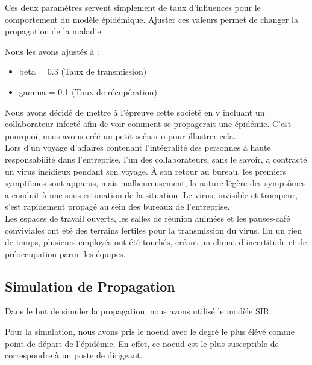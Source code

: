 \documentclass{article}
\begin{document}
Ces deux paramètres servent simplement de taux d'influences pour le comportement du modèle épidémique. Ajuster ces valeurs permet de changer la propagation de la maladie.

Nous les avons ajustés à :
\begin{itemize}
    \item beta = 0.3 (Taux de transmission)
    \item gamma = 0.1 (Taux de récupération)
\end{itemize}


Nous avons décidé de mettre à l'épreuve cette société en y incluant un collaborateur infecté afin de voir comment se propagerait une épidémie. C'est pourquoi, nous avons créé un petit scénario pour illustrer cela. \\

Lors d'un voyage d'affaires contenant l'intégralité des personnes à haute responsabilité dans l'entreprise, l'un des collaborateurs, sans le savoir, a contracté un virus insidieux pendant son voyage. À son retour au bureau, les premiers symptômes sont apparus, mais malheureusement, la nature légère des symptômes a conduit à une sous-estimation de la situation. Le virus, invisible et trompeur, s'est rapidement propagé au sein des bureaux de l'entreprise. \\

Les espaces de travail ouverts, les salles de réunion animées et les pauses-café conviviales ont été des terrains fertiles pour la transmission du virus. En un rien de temps, plusieurs employés ont été touchés, créant un climat d'incertitude et de préoccupation parmi les équipes.

\subsection{Simulation de Propagation}

Dans le but de simuler la propagation, nous avons utilisé le modèle SIR.

Pour la simulation, nous avons pris le noeud avec le degré le plus élévé comme point de départ de l'épidémie. En effet, ce noeud est le plus susceptible de correspondre à un poste de dirigeant. \\
\end{document}
